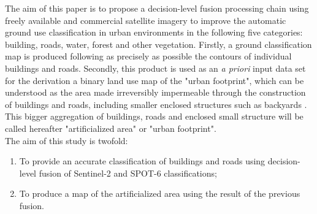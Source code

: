 \documentclass[10pt]{article}
\begin{document}
The aim of this paper is to propose a decision-level fusion processing chain using freely available and commercial satellite imagery to improve the automatic ground use classification in urban environments in the following five categories: building, roads, water, forest and other vegetation. Firstly, a ground classification map is produced following as precisely as possible the contours of individual buildings and roads. Secondly, this product is used as an \textit{a priori} input data set for the derivation a binary land use map of the "urban footprint", which can be understood as the area made irreversibly impermeable through the construction of buildings and roads, including smaller enclosed structures such as backyards \parencite{puissant_object-oriented_2014}. This bigger aggregation of buildings, roads and enclosed small structure will be called hereafter "artificialized area" or "urban footprint".\\

The aim of this study is twofold:
\begin{enumerate}
    \item To provide an accurate classification of buildings and roads using decision-level fusion of Sentinel-2 and SPOT-6 classifications;
    \item To produce a map of the artificialized area using the result of the previous fusion. 
\end{enumerate}

\end{document}
